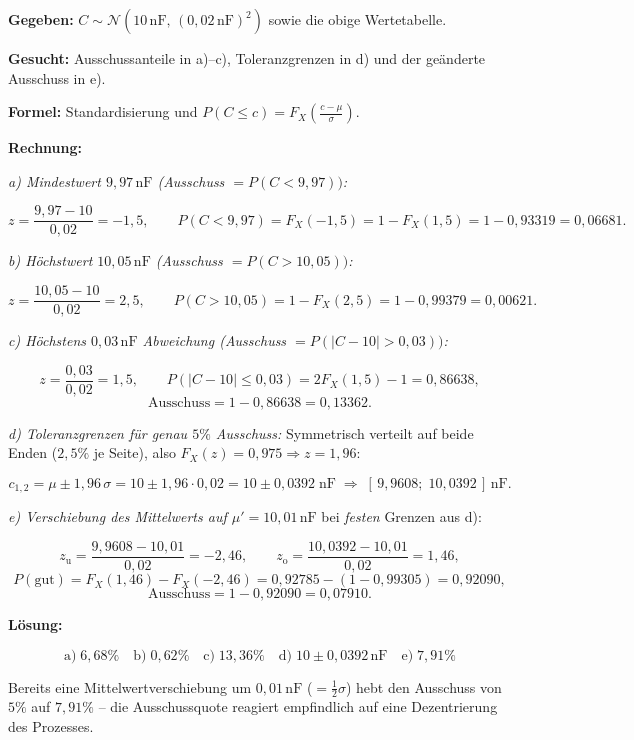 \begin{beispiel}

\textbf{Gegeben:} $C \sim \mathcal{N}(10\,\text{nF},\,(0{,}02\,\text{nF})^2)$
sowie die obige Wertetabelle.

\textbf{Gesucht:} Ausschussanteile in a)--c), Toleranzgrenzen in d) und der
geänderte Ausschuss in e).

\textbf{Formel:} Standardisierung und
$P(C \leq c) = F_X\!\left(\tfrac{c-\mu}{\sigma}\right)$.

\textbf{Rechnung:}

\emph{a) Mindestwert $9{,}97\,\text{nF}$ (Ausschuss $= P(C < 9{,}97))$:}

$$
z = \frac{9{,}97 - 10}{0{,}02} = -1{,}5, \qquad
P(C < 9{,}97) = F_X(-1{,}5) = 1 - F_X(1{,}5) = 1 - 0{,}93319 = 0{,}06681.
$$

\emph{b) Höchstwert $10{,}05\,\text{nF}$ (Ausschuss $= P(C > 10{,}05))$:}

$$
z = \frac{10{,}05 - 10}{0{,}02} = 2{,}5, \qquad
P(C > 10{,}05) = 1 - F_X(2{,}5) = 1 - 0{,}99379 = 0{,}00621.
$$

\emph{c) Höchstens $0{,}03\,\text{nF}$ Abweichung
(Ausschuss $= P(|C - 10| > 0{,}03))$:}

$$
z = \frac{0{,}03}{0{,}02} = 1{,}5, \qquad
P(|C-10| \leq 0{,}03) = 2F_X(1{,}5) - 1 = 0{,}86638,
$$
$$
\text{Ausschuss} = 1 - 0{,}86638 = 0{,}13362.
$$

\emph{d) Toleranzgrenzen für genau $5\%$ Ausschuss:} Symmetrisch verteilt auf
beide Enden ($2{,}5\%$ je Seite), also $F_X(z) = 0{,}975 \Rightarrow z = 1{,}96$:

$$
c_{1,2} = \mu \pm 1{,}96\,\sigma = 10 \pm 1{,}96 \cdot 0{,}02
= 10 \pm 0{,}0392 \;\text{nF}
\;\Rightarrow\; [\,9{,}9608;\; 10{,}0392\,]\,\text{nF}.
$$

\emph{e) Verschiebung des Mittelwerts auf $\mu' = 10{,}01\,\text{nF}$} bei
\emph{festen} Grenzen aus d):

$$
z_{\text{u}} = \frac{9{,}9608 - 10{,}01}{0{,}02} = -2{,}46, \qquad
z_{\text{o}} = \frac{10{,}0392 - 10{,}01}{0{,}02} = 1{,}46,
$$
$$
P(\text{gut}) = F_X(1{,}46) - F_X(-2{,}46) = 0{,}92785 - (1 - 0{,}99305)
= 0{,}92090,
$$
$$
\text{Ausschuss} = 1 - 0{,}92090 = 0{,}07910.
$$

\textbf{Lösung:}

$$
\boxed{\;
\text{a)}\; 6{,}68\% \quad
\text{b)}\; 0{,}62\% \quad
\text{c)}\; 13{,}36\% \quad
\text{d)}\; 10 \pm 0{,}0392\,\text{nF} \quad
\text{e)}\; 7{,}91\%
\;}
$$

Bereits eine Mittelwertverschiebung um $0{,}01\,\text{nF}$ ($=\tfrac12\sigma$)
hebt den Ausschuss von $5\%$ auf $7{,}91\%$ -- die Ausschussquote reagiert
empfindlich auf eine Dezentrierung des Prozesses.

\end{beispiel}

